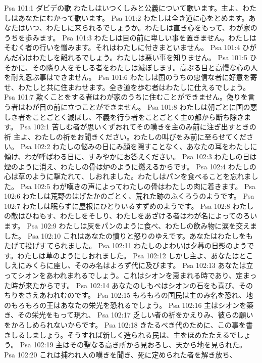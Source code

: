 Psa 101:1  ダビデの歌 わたしはいつくしみと公義について歌います。主よ、わたしはあなたにむかって歌います。
Psa 101:2  わたしは全き道に心をとめます。あなたはいつ、わたしに来られるでしょうか。わたしは直き心をもって、わが家のうちを歩みます。
Psa 101:3  わたしは目の前に卑しい事を置きません。わたしはそむく者の行いを憎みます。それはわたしに付きまといません。
Psa 101:4  ひがんだ心はわたしを離れるでしょう。わたしは悪い事を知りません。
Psa 101:5  ひそかに、その隣り人をそしる者をわたしは滅ぼします。高ぶる目と高慢な心の人を耐え忍ぶ事はできません。
Psa 101:6  わたしは国のうちの忠信な者に好意を寄せ、わたしと共に住まわせます。全き道を歩む者はわたしに仕えるでしょう。
Psa 101:7  欺くことをする者はわが家のうちに住むことができません。偽りを言う者はわが目の前に立つことができません。
Psa 101:8  わたしは朝ごとに国の悪しき者をことごとく滅ぼし、不義を行う者をことごとく主の都から断ち除きます。
Psa 102:1  苦しむ者が思いくずおれてその嘆きを主のみ前に注ぎ出すときの祈 主よ、わたしの祈をお聞きください。わたしの叫びをみ前に至らせてください。
Psa 102:2  わたしの悩みの日にみ顔を隠すことなく、あなたの耳をわたしに傾け、わが呼ばわる日に、すみやかにお答えください。
Psa 102:3  わたしの日は煙のように消え、わたしの骨は炉のように燃えるからです。
Psa 102:4  わたしの心は草のように撃たれて、しおれました。わたしはパンを食べることを忘れました。
Psa 102:5  わが嘆きの声によってわたしの骨はわたしの肉に着きます。
Psa 102:6  わたしは荒野のはげたかのごとく、荒れた跡のふくろうのようです。
Psa 102:7  わたしは眠らずに屋根にひとりいるすずめのようです。
Psa 102:8  わたしの敵はひねもす、わたしをそしり、わたしをあざける者はわが名によってのろいます。
Psa 102:9  わたしは灰をパンのように食べ、わたしの飲み物に涙を交えました。
Psa 102:10  これはあなたの憤りと怒りのゆえです。あなたはわたしをもたげて投げすてられました。
Psa 102:11  わたしのよわいは夕暮の日影のようです。わたしは草のようにしおれました。
Psa 102:12  しかし主よ、あなたはとこしえにみくらに座し、そのみ名はよろず代に及びます。
Psa 102:13  あなたは立ってシオンをあわれまれるでしょう。これはシオンを恵まれる時であり、定まった時が来たからです。
Psa 102:14  あなたのしもべはシオンの石をも喜び、そのちりをさえあわれむのです。
Psa 102:15  もろもろの国民は主のみ名を恐れ、地のもろもろの王はあなたの栄光を恐れるでしょう。
Psa 102:16  主はシオンを築き、その栄光をもって現れ、
Psa 102:17  乏しい者の祈をかえりみ、彼らの願いをかろしめられないからです。
Psa 102:18  きたるべき代のために、この事を書きしるしましょう。そうすれば新しく造られる民は、主をほめたたえるでしょう。
Psa 102:19  主はその聖なる高き所から見おろし、天から地を見られた。
Psa 102:20  これは捕われ人の嘆きを聞き、死に定められた者を解き放ち、
